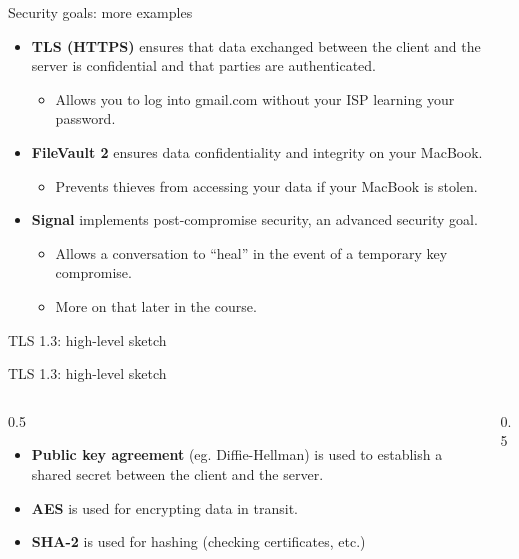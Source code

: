 \documentclass[aspectratio=169, lualatex, handout]{beamer}
\begin{document}
	\begin{frame}{Security goals: more examples}
		\begin{itemize}
			\item \textbf{TLS (HTTPS)} ensures that data exchanged between the client
				and the server is confidential and that parties are authenticated.
				\begin{itemize}
					\item Allows you to log into gmail.com without your ISP learning your password.
				\end{itemize}

			\item \textbf{FileVault 2} ensures data confidentiality and integrity on
				your MacBook.
				\begin{itemize}
					\item Prevents thieves from accessing your data if your MacBook is stolen.
				\end{itemize}

			\item \textbf{Signal} implements post-compromise security, an advanced security
				goal.
				\begin{itemize}
					\item Allows a conversation to ``heal'' in the event of a temporary key
						compromise.

					\item More on that later in the course.
				\end{itemize}
		\end{itemize}
	\end{frame}

	\begin{frame}{TLS 1.3: high-level sketch}
	\end{frame}

	\begin{frame}{TLS 1.3: high-level sketch}
		\begin{columns}[c]
			\begin{column}{0.5\textwidth}
				\begin{itemize}
					\item \textbf{Public key agreement} (eg. Diffie-Hellman) is used to establish
						a shared secret between the client and the server.

					\item \textbf{AES} is used for encrypting data in transit.

					\item \textbf{SHA-2} is used for hashing (checking certificates, etc.)
				\end{itemize}
			\end{column}

			\begin{column}{0.5\textwidth}
			\end{column}
		\end{columns}
	\end{frame}
\end{document}
